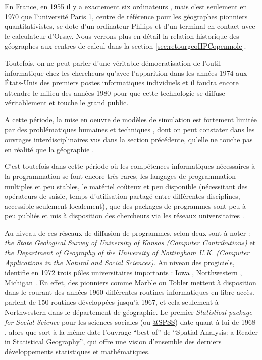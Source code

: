 En France, en 1955 il y a exactement six ordinateurs \autocite[3]{Armatte2008}, mais c'est seulement en 1970 que l'université Paris 1, centre de référence pour les géographes pionniers quantitativistes, se dote d'un ordinateur Philips et d'un terminal en contact avec le calculateur d'Orsay. Nous verrons plus en détail la relation historique des géographes aux centres de calcul dans la section \ref{sec:retourgeoHPCopenmole}.

Toutefois, on ne peut parler d'une véritable démocratisation de l'outil informatique chez les chercheurs qu'avec l'apparition dans les années 1974 aux États-Unis des premiers postes informatiques individuels \autocite[221]{Ceruzzi2000} et il faudra encore attendre le milieu des années 1980 pour que cette technologie se diffuse véritablement et touche le grand public.

A cette période, la mise en oeuvre de modèles de simulation est fortement limitée par des problématiques humaines et techniques \autocites{Haggett1969}[387]{Marble1972}, dont on peut constater dans les ouvrages interdisciplinaires vus dans la section précédente, qu'elle ne touche pas en réalité que la géographie \autocite{Guetzkow1972}.

C'est toutefois dans cette période où les compétences informatiques nécessaires à la programmation se font encore très rares, les langages de programmation multiples et peu stables, le matériel coûteux et peu disponible (nécessitant des opérateurs de saisie, temps d'utilisation partagé entre différentes disciplines, accessible seulement localement), que des packages de programmes sont peu à peu publiés et mis à disposition des chercheurs via les réseaux universitaires \autocite{Haggett1969}.

Au niveau de ces réseaux de diffusion de programmes, selon \textcite[20-21]{Greer1972} deux sont à noter : \textit{the State Geological Survey of University of Kansas (Computer Contributions)}  et \textit{ the Department of Geography of the University of Nottingham U.K. (Computer Applications in the Natural and Social Sciences)}. Au niveau des progiciels, \textcite[20-21]{Greer1972} identifie en 1972 trois pôles universitaires importants : Iowa \autocite{Wittick1968}, Northwestern \autocites{Marble1967, Marble1972b, Marble1972,Marble2010}, Michigan \autocite{Tobler1970c}. En effet, des pionniers comme Marble ou Tobler mettent à disposition dans le courant des années 1960 différentes routines informatiques en libre accès. \textcites[3]{Marble1967, Pitts1968} parlent de 150 routines développées jusqu'à 1967, et cela seulement à Northwestern dans le département de géographie. Le premier \textit{Statistical package for Social Science} pour les sciences sociales (ou \href{http://www.spss.com.hk/corpinfo/history.htm}{@SPSS}) date quant à lui de 1968 \autocite{Barnes2011}, alors que sort à la même date l'ouvrage \foreignquote{english}{best-of} de \textcite{Berry1968} \foreignquote{english}{Spatial Analysis: a Reader in Statistical Geography}, qui offre une vision d'ensemble des derniers développements statistiques et mathématiques.

